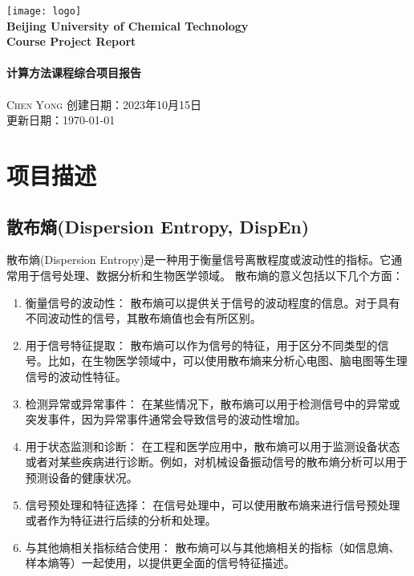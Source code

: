 \documentclass[cs4size,a4paper]{ctexart}
\begin{document}
\begin{titlepage}
	\begin{center}
		\texttt{[image: logo]}\\[1cm]
		\textsf{\LARGE\bfseries Beijing University of Chemical Technology}\\[1.0cm]
		\textsf{\Large\bfseries Course Project Report}\\[0.5cm]
		\HRule \\[0.8cm]
		{\huge \bfseries 计算方法课程综合项目报告}\\[0.4cm]
		\HRule \\[0.7cm]
		\textsc{Chen Yong}
		\tableofcontents
		\vfill
		{创建日期：2023年10月15日}\\
		{更新日期：\today}
	\end{center}
\end{titlepage}

\newpage
\section{项目描述}
\subsection{散布熵(Dispersion Entropy, DispEn)}
散布熵(Dispersion Entropy)是一种用于衡量信号离散程度或波动性的指标。它通常用于信号处理、数据分析和生物医学领域。
散布熵的意义包括以下几个方面：
\begin{enumerate}
	\item 衡量信号的波动性：
	      散布熵可以提供关于信号的波动程度的信息。对于具有不同波动性的信号，其散布熵值也会有所区别。
	\item 用于信号特征提取：
	      散布熵可以作为信号的特征，用于区分不同类型的信号。比如，在生物医学领域中，可以使用散布熵来分析心电图、脑电图等生理信号的波动性特征。
	\item 检测异常或异常事件：
	      在某些情况下，散布熵可以用于检测信号中的异常或突发事件，因为异常事件通常会导致信号的波动性增加。
	\item 用于状态监测和诊断：
	      在工程和医学应用中，散布熵可以用于监测设备状态或者对某些疾病进行诊断。例如，对机械设备振动信号的散布熵分析可以用于预测设备的健康状况。
	\item 信号预处理和特征选择：
	      在信号处理中，可以使用散布熵来进行信号预处理或者作为特征进行后续的分析和处理。
	\item 与其他熵相关指标结合使用：
	      散布熵可以与其他熵相关的指标（如信息熵、样本熵等）一起使用，以提供更全面的信号特征描述。
\end{enumerate}
\end{document}
